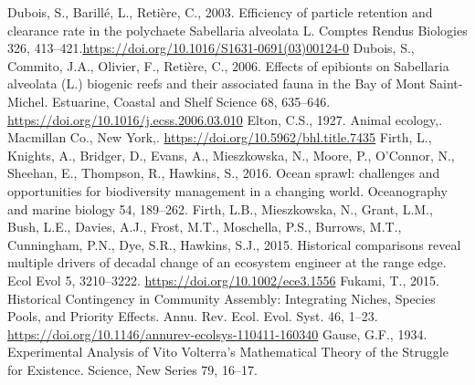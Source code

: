 \documentclass[12pt]{report}
\begin{document}
\begin{singlespacing}
\newline\newline
Dubois, S., Barillé, L., Retière, C., 2003. Efficiency of particle retention and clearance rate in the polychaete Sabellaria alveolata L. Comptes Rendus Biologies 326, 413–421.\newline \href{https://doi.org/10.1016/S1631-0691(03)00124-0}{https://doi.org/10.1016/S1631-0691(03)00124-0}
\newline\newline
Dubois, S., Commito, J.A., Olivier, F., Retière, C., 2006. Effects of epibionts on Sabellaria alveolata (L.) biogenic reefs and their associated fauna in the Bay of Mont Saint-Michel. Estuarine, Coastal and Shelf Science 68, 635–646. \href{https://doi.org/10.1016/j.ecss.2006.03.010}{https://doi.org/10.1016/j.ecss.2006.03.010}
\newline\newline
Elton, C.S., 1927. Animal ecology,. Macmillan Co., New York,. \newline
\href{https://doi.org/10.5962/bhl.title.7435}{https://doi.org/10.5962/bhl.title.7435}
\newline\newline
Firth, L., Knights, A., Bridger, D., Evans, A., Mieszkowska, N., Moore, P., O’Connor, N., Sheehan, E., Thompson, R., Hawkins, S., 2016. Ocean sprawl: challenges and opportunities for biodiversity management in a changing world. Oceanography and marine biology 54, 189–262.
\newline\newline
Firth, L.B., Mieszkowska, N., Grant, L.M., Bush, L.E., Davies, A.J., Frost, M.T., Moschella, P.S., Burrows, M.T., Cunningham, P.N., Dye, S.R., Hawkins, S.J., 2015. Historical comparisons reveal multiple drivers of decadal change of an ecosystem engineer at the range edge. Ecol Evol 5, 3210–3222. \href{https://doi.org/10.1002/ece3.1556}{https://doi.org/10.1002/ece3.1556}
\newline\newline
Fukami, T., 2015. Historical Contingency in Community Assembly: Integrating Niches, Species Pools, and Priority Effects. Annu. Rev. Ecol. Evol. Syst. 46, 1–23. \href{https://doi.org/10.1146/annurev-ecolsys-110411-160340}{https://doi.org/10.1146/annurev-ecolsys-110411-160340}
\newline\newline
Gause, G.F., 1934. Experimental Analysis of Vito Volterra’s Mathematical Theory of the Struggle for Existence. Science, New Series 79, 16–17.
\newline\newline

\end{singlespacing}
\end{document}
